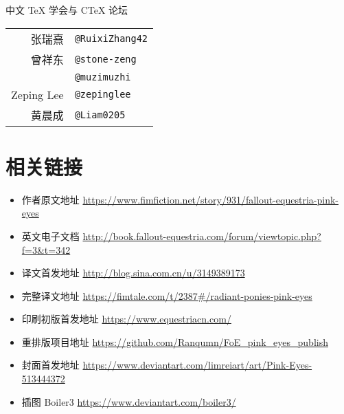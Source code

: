 \begin{table}[H]
    \centering

    \begin{center}
    中文 \TeX{} 学会\footnotemark 与 C\TeX{} 论坛\footnotemark
    \end{center}

    \begin{tabular}{rl}
        张瑞熹 & \texttt{@RuixiZhang42} \\
        曾祥东 & \texttt{@stone-zeng} \\
        & \texttt{@muzimuzhi} \\
        Zeping Lee & \texttt{@zepinglee} \\
        黄晨成 & \texttt{@Liam0205} \\
    \end{tabular}
\end{table}

\addtocounter{footnote}{-2} %


\section*{相关链接}

\begin{itemize}
    \item 作者原文地址 \url{https://www.fimfiction.net/story/931/fallout-equestria-pink-eyes}
    \item 英文电子文档 \url{http://book.fallout-equestria.com/forum/viewtopic.php?f=3\&t=342}
    \item 译文首发地址 \url{http://blog.sina.com.cn/u/3149389173}
    \item 完整译文地址 \url{https://fimtale.com/t/2387\#/radiant-ponies-pink-eyes}
    \item 印刷初版首发地址 \url{https://www.equestriacn.com/}
    \item 重排版项目地址 \url{https://github.com/Ranqumn/FoE_pink_eyes_publish}
    \item 封面首发地址 \url{https://www.deviantart.com/limreiart/art/Pink-Eyes-513444372}
    \item 插图 Boiler3 \url{https://www.deviantart.com/boiler3/}
\end{itemize}



\clearpage

